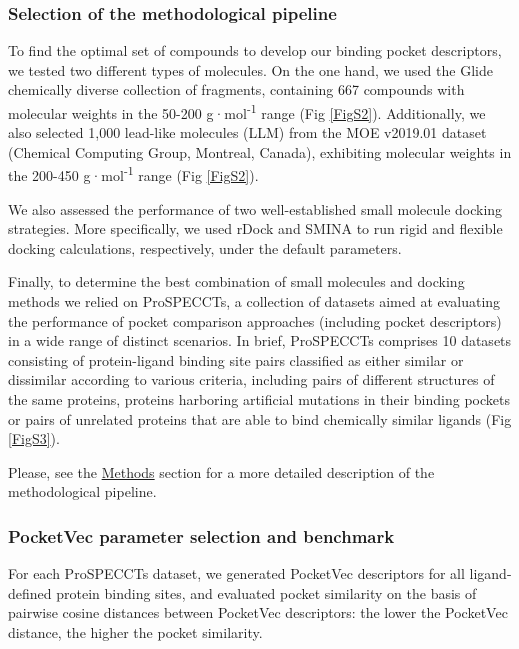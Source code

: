 \subsubsection{Selection of the methodological pipeline}

To find the optimal set of compounds to develop our binding pocket descriptors, we tested two different types of molecules. On the one hand, we used the Glide chemically diverse collection of fragments\cite{friesner_glide_2004, halgren_glide_2004}, containing 667 compounds with molecular weights in the 50-200 g·mol\textsuperscript{-1} range (Fig \ref{FigS2}). Additionally, we also selected 1,000 lead-like molecules (LLM) from the MOE v2019.01 dataset (Chemical Computing Group, Montreal, Canada), exhibiting molecular weights in the 200-450 g·mol\textsuperscript{-1} range (Fig \ref{FigS2}).

We also assessed the performance of two well-established small molecule docking strategies. More specifically, we used rDock\cite{ruiz-carmona_rdock_2014} and SMINA\cite{koes_lessons_2013} to run rigid and flexible docking calculations, respectively, under the default parameters.

Finally, to determine the best combination of small molecules and docking methods we relied on ProSPECCTs, a collection of datasets aimed at evaluating the performance of pocket comparison approaches (including pocket descriptors) in a wide range of distinct scenarios\cite{ehrt_benchmark_2018}. In brief, ProSPECCTs comprises 10 datasets consisting of protein-ligand binding site pairs classified as either similar or dissimilar according to various criteria, including pairs of different structures of the same proteins, proteins harboring artificial mutations in their binding pockets or pairs of unrelated proteins that are able to bind chemically similar ligands (Fig \ref{FigS3}).

Please, see the \hyperref[PocketVec_Methods]{Methods} section for a more detailed description of the methodological pipeline.


\subsubsection{PocketVec parameter selection and benchmark}

For each ProSPECCTs dataset, we generated PocketVec descriptors for all ligand-defined protein binding sites, and evaluated pocket similarity on the basis of pairwise cosine distances between PocketVec descriptors: the lower the PocketVec distance, the higher the pocket similarity. 

